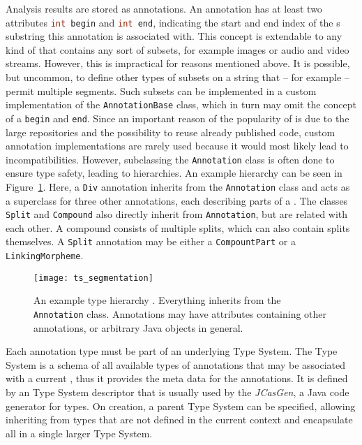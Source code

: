 Analysis results are stored as annotations. An annotation has at least two attributes \lstinline[language=Java]|int begin| and \lstinline[language=Java]|int end|, indicating the start and end index of the \sofa{}s substring this annotation is associated with. This concept is extendable to any kind of \sofa{} that contains any sort of subsets, for example images or audio and video streams. However, this is impractical for reasons mentioned above. It is possible, but uncommon, to define other types of subsets on a string that -- for example -- permit multiple segments. Such subsets can be implemented in a custom implementation of the \lstinline|AnnotationBase| class, which in turn may omit the concept of a \lstinline|begin| and \lstinline|end|. Since an important reason of the popularity of \uima{} is due to the large \anen{} repositories and the possibility to reuse already published code, custom annotation implementations are rarely used because it would most likely lead to incompatibilities. However, subclassing the \lstinline|Annotation| class is often done to ensure type safety, leading to hierarchies. An example hierarchy can be seen in Figure~\ref{fig:uima_types}. Here, a \lstinline|Div| annotation inherits from the \lstinline|Annotation| class and acts as a superclass for three other annotations, each describing parts of a \sofa{}. The classes \lstinline|Split| and \lstinline|Compound| also directly inherit from \lstinline|Annotation|, but are related with each other. A compound consists of multiple splits, which can also contain splits themselves. A \lstinline|Split| annotation may be either a \lstinline|CompountPart| or a \lstinline|LinkingMorpheme|.
\begin{figure}[hbt]
	\centering
	\texttt{[image: ts\_segmentation]}
	\caption[An example UIMA type hierarchy.]{An example \uima{} type hierarchy \cite{dkpro_ts}. Everything inherits from the \lstinline|Annotation| class. Annotations may have attributes containing other annotations, or arbitrary Java objects in general.}
	\label{fig:uima_types}
\end{figure}


Each annotation type must be part of an underlying Type System. The Type System is a schema of all available types of annotations that may be associated with a current \sofa{}, thus it provides the meta data for the annotations. It is defined by an \xml{} Type System descriptor that is usually used by the \emph{JCasGen}, a Java code generator for \uima{} types. On creation, a parent Type System can be specified, allowing inheriting from types that are not defined in the current context and encapsulate all in a single larger Type System.

